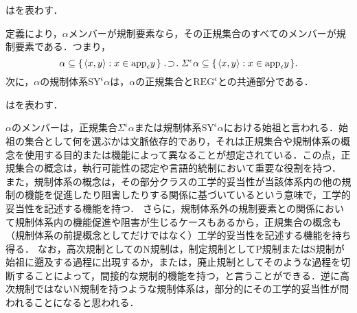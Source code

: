 \begin{df}
\label{df:正規集合}
\kagi{$
    \varSigma^{\epsilon}\alpha
$}はを表わす．
\end{df}

\noindent 定義により，$ \alpha $メンバーが規制要素なら，その正規集合のすべてのメンバーが規制要素である．つまり，
\[
    \alpha\subseteq\classab{\orp{x,y}:x\in\app{\epsilon} y}\case{1}{1}{1}\varSigma^{\epsilon}\alpha\subseteq\classab{\orp{x,y}:x\in\app{\epsilon} y}.
\]
次に，$\alpha$の規制体系$ \mathrm{SY}^{\epsilon}\alpha $は，$\alpha$の正規集合と$ \mathrm{REG}^\epsilon $との共通部分である．

\begin{df}
\label{df:規制体系}
はを表わす．
\end{df}

\noindent $ \alpha $のメンバーは，正規集合$ \varSigma^{\epsilon}\alpha $または規制体系$ \mathrm{SY}^{\epsilon}\alpha $における始祖と言われる．始祖の集合として何を選ぶかは文脈依存的であり，それは正規集合や規制体系の概念を使用する目的または機能によって異なることが想定されている．この点，正規集合の概念は，執行可能性の認定や言語的統制において重要な役割を持つ．
また，規制体系の概念は，その部分クラスの工学的妥当性が当該体系内の他の規制の機能を促進したり阻害したりする関係に基づいているという意味で，工学的妥当性を記述する機能を持つ．
さらに，規制体系外の規制要素との関係において規制体系内の機能促進や阻害が生じるケースもあるから，正規集合の概念も（規制体系の前提概念としてだけではなく）工学的妥当性を記述する機能を持ち得る．
なお，高次規制としてのN規制は，制定規制としてP規制またはS規制が始祖に遡及する過程に出現するか，または，廃止規制としてそのような過程を切断することによって，間接的な規制的機能を持つ，と言うことができる．逆に高次規制ではないN規制を持つような規制体系は，部分的にその工学的妥当性が問われることになると思われる．

